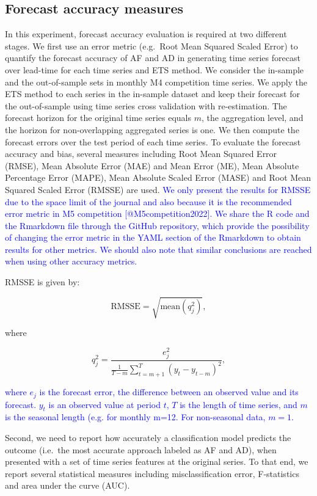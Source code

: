 \documentclass[preprint, 3p,
authoryear]{elsarticle} %
\begin{document}
\hypertarget{errormetric}{%
\subsection{Forecast accuracy measures}\label{errormetric}}

In this experiment, forecast accuracy evaluation is required at two
different stages. We first use an error metric (e.g.~Root Mean Squared
Scaled Error) to quantify the forecast accuracy of AF and AD in
generating time series forecast over lead-time for each time series and
ETS method. We consider the in-sample and the out-of-sample sets in
monthly M4 competition time series. We apply the ETS method to each
series in the in-sample dataset and keep their forecast for the
out-of-sample using time series cross validation with re-estimation. The
forecast horizon for the original time series equals \(m\), the
aggregation level, and the horizon for non-overlapping aggregated series
is one. We then compute the forecast errors over the test period of each
time series. To evaluate the forecast accuracy and bias, several
measures including Root Mean Squared Error (RMSE), Mean Absolute Error
(MAE) and Mean Error (ME), Mean Absolute Percentage Error (MAPE), Mean
Absolute Scaled Error (MASE) and Root Mean Squared Scaled Error (RMSSE)
are used.
\textcolor{blue}{We only present the results for RMSSE due to the space limit of the journal and also because it is the recommended error metric in M5 competition [@M5competition2022]. We share the R code and the Rmarkdown file through the GitHub repository, which provide the possibility of changing the error metric in the YAML section of the Rmarkdown to obtain results for other metrics. We should also note that similar conclusions are reached when using other accuracy metrics.}

RMSSE is given by:

\[ \text{RMSSE} = \sqrt{\text{mean}(q_{j}^2)},\]

where

\[q^2_{j} = \frac{\displaystyle e^2_{j}}
    {\displaystyle\frac{1}{T-m}\sum_{t=m+1}^T (y_{t}-y_{t-m})^2},\]

\textcolor{blue}{where $e_{j}$ is the forecast error, the difference between an observed value and its forecast. $y_{t}$ is an observed value at period $t$, $T$ is the length of time series, and $m$ is the seasonal length (e.g. for monthly m=12. For non-seasonal data, $m=1$.}

Second, we need to report how accurately a classification model predicts
the outcome (i.e.~the most accurate approach labeled as AF and AD), when
presented with a set of time series features at the original series. To
that end, we report several statistical measures including
misclassification error, F-statistics and area under the curve (AUC).
\end{document}
